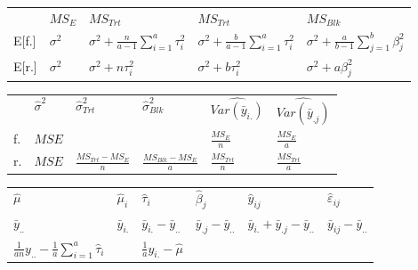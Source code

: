 \documentclass[10pt,portrait]{article}
\begin{document}
\begin{multicols}{2}
\begin{tabular}{l|l|l|l|l}
     &$MS_{E}$  & $MS_{Trt}$ & $MS_{Trt}$ & $MS_{Blk}$ \\
E[f.]&$\sigma^2$& $\sigma^2+\frac{n}{a-1}\sum_{i=1}^a\tau_i^2$& $\sigma^2+\frac{b}{a-1}\sum_{i=1}^a\tau_i^2$&$\sigma^2+\frac{a}{b-1}\sum_{j=1}^b\beta_j^2$\\
E[r.]&$\sigma^2$& $\sigma^2+n\tau_i^2$& $\sigma^2+b\tau_i^2$ & $\sigma^2+a\beta_j^2$\\
\hline
\end{tabular}

\begin{tabular}{l|l|l|l|l|l}
&$\hat\sigma^2$&$\hat\sigma_{Trt}^2$&$\hat\sigma_{Blk}^2$&$\widehat{Var(\bar y_{i.})}$&$\widehat{Var(\bar y_{.j})}$\\
f.&$MSE$& & &$\frac{MS_{E}}{n}$& $\frac{MS_{E}}{a}$\\
r.&$MSE$&$\frac{MS_{Trt}-MS_{E}}{n}$&$\frac{MS_{Blk}-MS_{E}}{a}$&$\frac{MS_{Trt}}{n}$&$\frac{MS_{Trt}}{a}$\\
\end{tabular}

\begin{tabular}{l|l|l|l|l|l}
$\hat\mu$&$\hat\mu_i$&$\hat\tau_i$&$\hat\beta_j$&$\hat y_{ij}$&$\hat\varepsilon_{ij}$\\
$\bar y_{..}$&$\bar y_{i.}$&$\bar y_{i.}-\bar y_{..}$&$\bar y_{.j}-\bar y_{..}$&$\bar y_{i.}+\bar y_{.j}-\bar y_{..}$&$\bar y_{ij}-\bar y_{..}$\\
$\frac1{an}y_{..}-\frac1{a}\sum_{i=1}^a\hat\tau_i$& & $\frac1{a}y_{i.}-\hat\mu$\\
\hline
\end{tabular}


\end{multicols}
\end{document}
